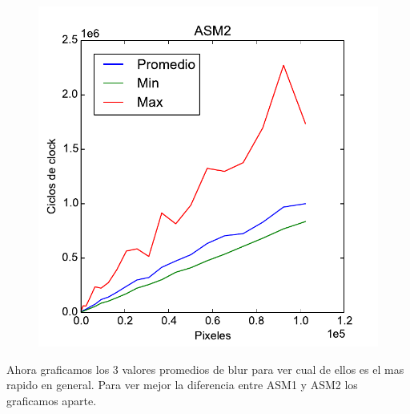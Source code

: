 \begin{figure}[h!]
	\includegraphics[scale=0.45]{images/asm2_blur}
\end{figure}

Ahora graficamos los 3 valores promedios de blur para ver cual de ellos es el mas rapido en general. Para ver mejor la diferencia entre ASM1 y ASM2 los graficamos aparte.

